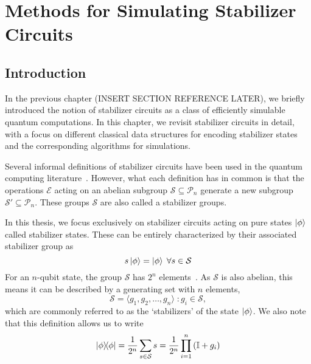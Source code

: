 
\chapter[Methods for Simulating Stabilizer Circuits]{Methods for Simulating Stabilizer\\ Circuits}
\label{chap:stabilizers}

\section{Introduction}\label{sec:stabilizer-intro}
In the previous chapter (INSERT SECTION REFERENCE LATER), we briefly introduced the notion of stabilizer circuits as a class of efficiently simulable quantum computations. In this chapter, we revisit stabilizer circuits in detail, with a focus on different classical data structures for encoding stabilizer states and the corresponding algorithms for simulations.\par
Several informal definitions of stabilizer circuits have been used in the quantum computing literature~\cite{Gottesman1998b,Aaronson2004,VandenNest2008,Seddon2019}. However, what each definition has in common is that the operations $\mathcal{E}$ acting on an abelian subgroup $\mathcal{S} \subseteq \mathcal{P}_{n}$ generate a new subgroup $\mathcal{S'}\subseteq \mathcal{P}_{n}$. These groups $\mathcal{S}$ are also called a stabilizer groups.\par
In this thesis, we focus exclusively on stabilizer circuits acting on pure states $\ket{\phi}$ called stabilizer states. These can be entirely characterized by their associated stabilizer group as
\begin{equation}
    s\ket{\phi}=\ket{\phi}\;\forall s\in\mathcal{S}
\end{equation}
For an $n$-qubit state, the group $\mathcal{S}$ has $2^{n}$ elements~\cite{Gottesman1998b}. As $\mathcal{S}$ is also abelian, this means it can be described by a generating set with $n$ elements,
\begin{equation}
    \mathcal{S} = \langle g_{1}, g_{2},\dots,g_{n}\rangle \; : g_{i}\in\mathcal{S},
\end{equation}
which are commonly referred to as the `stabilizers' of the state $\ket{\phi}$. We also note that this definition allows us to write
\begin{equation}
    \ketbra{\phi} = \frac{1}{2^{n}}\sum_{s\in\mathcal{S}} s = \frac{1}{2^{n}}\prod_{i=1}^{n}\left(\mathbb{I}+g_{i}\right)
\end{equation}
